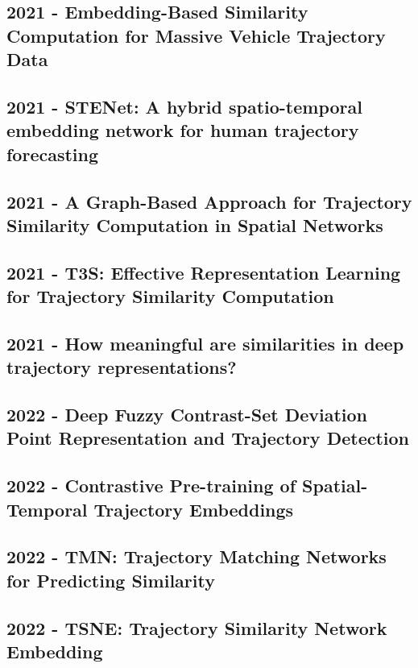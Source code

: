\subsection*{2021 - Embedding-Based Similarity Computation for Massive Vehicle Trajectory Data}
\cite{chen2021embedding}

\subsection*{2021 - STENet: A hybrid spatio-temporal embedding network for human trajectory forecasting}
\cite{zhang2021stenet}

\subsection*{2021 - A Graph-Based Approach for Trajectory Similarity Computation in Spatial Networks}
\cite{han2021graph}

\subsection*{2021 - T3S: Effective Representation Learning for Trajectory Similarity Computation}
\cite{yang2021t3s}

\subsection*{2021 - How meaningful are similarities in deep trajectory representations?}
\cite{taghizadeh2021meaningful}

\subsection*{2022 - Deep Fuzzy Contrast-Set Deviation Point Representation and Trajectory Detection}
\cite{ahmed2022deep}

\subsection*{2022 - Contrastive Pre-training of Spatial-Temporal Trajectory Embeddings}
\cite{lin2022contrastive}

\subsection*{2022 - TMN: Trajectory Matching Networks for Predicting Similarity}
\cite{yang2022tmn}

\subsection*{2022 - TSNE: Trajectory Similarity Network Embedding}
\cite{ding2022tsne}

